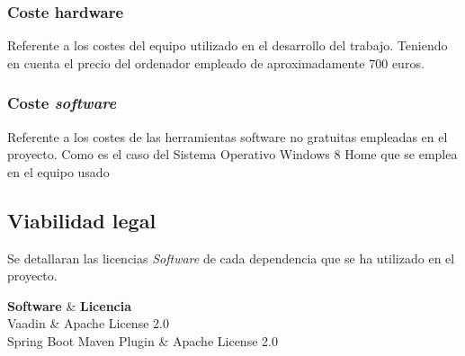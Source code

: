 \subsubsection{Coste hardware}
Referente a los costes del equipo utilizado en el desarrollo del trabajo. Teniendo en cuenta el precio del ordenador empleado de aproximadamente 700 euros.

\subsubsection{Coste \emph{software}}
Referente a los costes de las herramientas software no gratuitas empleadas en el proyecto. Como es el caso del Sistema Operativo Windows 8 Home que se emplea en el equipo usado

\subsection{Viabilidad legal}
Se detallaran las licencias \emph{Software} de cada dependencia que se ha utilizado en el proyecto.

{\textbf{Software} & \textbf{Licencia} \\}{
	Vaadin & Apache License 2.0 \\
	Spring Boot Maven Plugin & Apache License 2.0 \\	
}